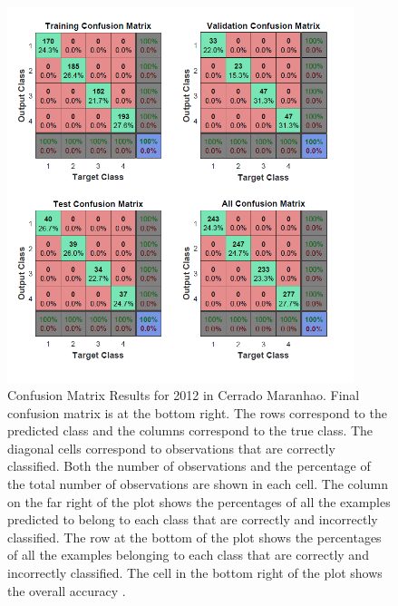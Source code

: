 \begin{figure}[htpb]
 \centering
\includegraphics[width=0.9\textwidth]{Chapter2/2005_CM_Mai_MA_N.png}
\caption[Confusion Matrix Results for 2012 in Cerrado Maranhao]{Confusion Matrix Results for 2012 in Cerrado Maranhao. Final confusion matrix is at the bottom right. The rows correspond to the predicted class and the columns correspond to the true class. The diagonal cells correspond to observations that are correctly classified. Both the number of observations and the percentage of the total number of observations are shown in each cell. The column on the far right of the plot shows the percentages of all the examples predicted to belong to each class that are correctly and incorrectly classified. The row at the bottom of the plot shows the percentages of all the examples belonging to each class that are correctly and incorrectly classified. The cell in the bottom right of the plot shows the overall accuracy \citep{matlab_2017}.}
\end{figure}



